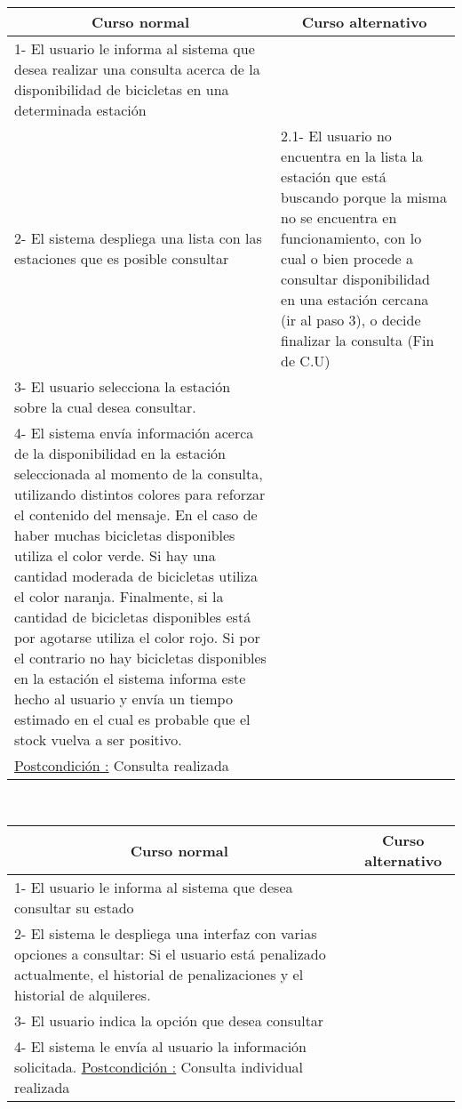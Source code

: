 ~

\begin{center}
    \centering
    \begin{tabular}{ | p{11cm} | p{6cm} | }
    	\multicolumn{1}{c}{\cellcolor{black!30}\textbf{Curso normal}} & 
    	\multicolumn{1}{c}{\cellcolor{black!30}\textbf{Curso alternativo}} \\
		\hline
		1- El usuario le informa al sistema que desea realizar una consulta acerca de la disponibilidad
		de bicicletas en una determinada estación & \\ \hline
		2- El sistema despliega una lista con las estaciones que es posible consultar & 
		2.1- El usuario no encuentra en la lista la estación que está buscando porque la misma no se encuentra en
		funcionamiento, con lo cual o bien procede a consultar disponibilidad en una estación cercana (ir al paso 3), o
		decide finalizar la consulta (Fin de C.U)\\ \hline
		3- El usuario selecciona la estación sobre la cual desea consultar. & \\ \hline
		4- El sistema envía información acerca de la disponibilidad en la estación seleccionada al momento de la consulta, utilizando distintos colores para reforzar el contenido del mensaje. En el caso de haber muchas bicicletas disponibles utiliza el color verde. Si hay una cantidad moderada de bicicletas utiliza el color naranja. Finalmente,
		si la cantidad de bicicletas disponibles está por agotarse utiliza el color rojo. Si por el contrario no hay
		bicicletas disponibles en la estación el sistema informa este hecho al usuario y envía un tiempo estimado en el cual
		es probable que el stock vuelva a ser positivo. & \\ \hline
		\underline{Postcondición :} Consulta realizada & \\ \hline
    \end{tabular}
\end{center}	

~

\begin{center}
    \centering
    \begin{tabular}{ | p{11cm} | p{6cm} | }
    	\multicolumn{1}{c}{\cellcolor{black!30}\textbf{Curso normal}} & 
    	\multicolumn{1}{c}{\cellcolor{black!30}\textbf{Curso alternativo}} \\
		\hline
		1- El usuario le informa al sistema que desea consultar su estado & \\ \hline
		2- El sistema le despliega una interfaz con varias opciones a consultar:
		Si el usuario está penalizado actualmente, el historial de 
		penalizaciones y el historial de alquileres. & \\ \hline
		3- El usuario indica la opción que desea consultar & \\ \hline
		4- El sistema le envía al usuario la información solicitada.
		\underline{Postcondición :} Consulta individual realizada & \\ \hline
    \end{tabular}
\end{center}


